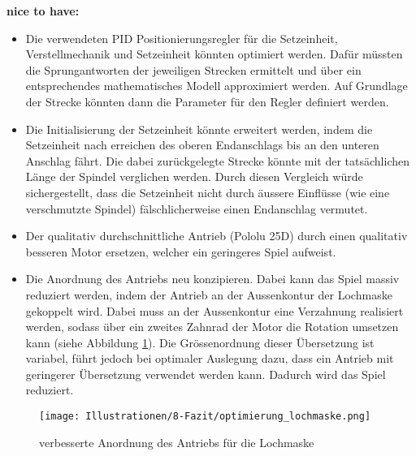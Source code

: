 \textbf{nice to have:}
\begin{itemize}
	\item Die verwendeten PID Positionierungsregler für die Setzeinheit, Verstellmechanik und Setzeinheit könnten optimiert werden. Dafür müssten die Sprungantworten der jeweiligen Strecken ermittelt und über ein entsprechendes mathematisches Modell approximiert werden. Auf Grundlage der Strecke könnten dann die Parameter für den Regler definiert werden.
	\item Die Initialisierung der Setzeinheit könnte erweitert werden, indem die Setzeinheit nach erreichen des oberen Endanschlags bis an den unteren Anschlag fährt. Die dabei zurückgelegte Strecke könnte mit der tatsächlichen Länge der Spindel verglichen werden. Durch diesen Vergleich würde sichergestellt, dass die Setzeinheit nicht durch äussere Einflüsse (wie eine verschmutzte Spindel) fälschlicherweise einen Endanschlag vermutet.
	\item Der qualitativ durchschnittliche Antrieb (Pololu 25D) durch einen qualitativ besseren Motor ersetzen, welcher ein geringeres Spiel aufweist.
	\item Die Anordnung des Antriebs neu konzipieren. Dabei kann das Spiel massiv reduziert werden, indem der Antrieb an der Aussenkontur der Lochmaske gekoppelt wird. Dabei muss an der Aussenkontur eine Verzahnung realisiert werden, sodass über ein zweites Zahnrad der Motor die Rotation umsetzen kann (siehe Abbildung \ref{fig:optimierung_lochmaske}). Die Grössenordnung dieser Übersetzung ist variabel, führt jedoch bei optimaler Auslegung dazu, dass ein Antrieb mit geringerer Übersetzung verwendet werden kann. Dadurch wird das Spiel reduziert. 
\end{itemize}

\begin{figure}[H]
	\texttt{[image: Illustrationen/8-Fazit/optimierung\_lochmaske.png]}
	\caption{verbesserte Anordnung des Antriebs für die Lochmaske}
	\label{fig:optimierung_lochmaske}
\end{figure}